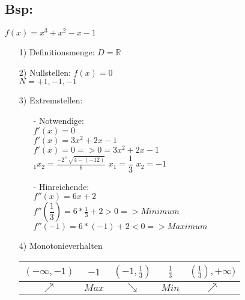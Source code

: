 \documentclass[.../mainfile.tex]{subfiles}
\begin{document}
	\subsection*{Bsp:} $f(x)=x^3+x^2-x-1$
	\begin{itemize}
		\item[1)] Definitionsmenge: $D=\mathbb{R}$
		\item[2)] Nullstellen: $f(x)=0$\\
			$N= +1, -1, -1$
		\item[3)] Extremstellen:  
		\begin{itemize}
			\item[-] Notwendige:\\
			$f'(x)=0$\\
			$f'(x)=3x^2+2x-1$\\
			$f'(x)=0 => 0=3x^2+2x-1$\\
			$_{1}x_{2}=\frac{-2_{-}^{+}\sqrt{4-(-12)}}{6}$
			$x_{1}=\dfrac{1}{3}$
			$x_{2}=-1$
			\item[-] Hinreichende:\\
			$f''(x)=6x+2$\\
			$f''(\dfrac{1}{3})=6*\frac{1}{3}+2>0 => Minimum$\\
			$f''(-1)=6*(-1)+2<0 => Maximum$
		\end{itemize}
		\item[4)] Monotonieverhalten\\
		\begin{tabular}{c|c|c|c|c}
			$(-\infty, -1)$ & $-1$ & $(-1, \frac{1}{3})$ & $\frac{1}{3}$ & $(\frac{1}{3}), +\infty)$ \\ 
			\hline
			$\nearrow$ & $Max$ & $\searrow$ & $Min$ & $\nearrow$ \\ 
		\end{tabular}
	\end{itemize}
	
	
	
	
	
	
	
	
\end{document}
